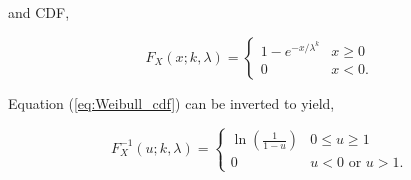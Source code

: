 \documentclass[12pt]{article}
\begin{document}
and CDF,

\begin{equation}
\label{eq:Weibull_cdf}
F_X(x; k, \lambda) =
\begin{cases}
1 - e^{{-x/\lambda}^k} & x \geq 0 \\
0 & x < 0.
\end{cases}
\end{equation}

Equation (\ref{eq:Weibull_cdf}) can be inverted to yield,

\begin{equation}
\label{eq:Weibull_inverse_cdf}
F_X^{-1}(u; k, \lambda) =
\begin{cases}
\ln\left(\frac{1}{1 - u}\right) & 0 \leq u \geq 1 \\
0 & u < 0 \text{ or } u > 1.
\end{cases}
\end{equation}
\end{document}
